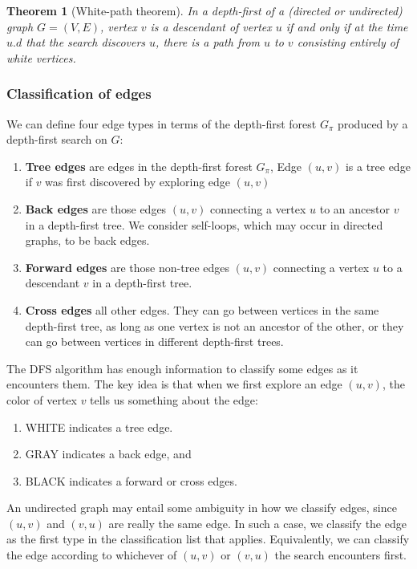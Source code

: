 \documentclass[12pt]{article}
\newtheorem{theorem}{Theorem}
\begin{document}
\begin{theorem} [White-path theorem]
  In a depth-first of a (directed or undirected) graph $G = (V,E)$, vertex $v$ is a descendant of vertex $u$ if and only if at the time $u.d$ that the search discovers $u$, there is a path from $u$ to $v$ consisting entirely of white vertices.
\end{theorem}

\subsubsection*{Classification of edges}

We can define four edge types in terms of the depth-first forest $G_{\pi}$ produced by a depth-first search on $G$:

\begin{enumerate}
  \item \textbf{Tree edges} are edges in the depth-first forest $G_{\pi}$, Edge $(u,v)$ is a tree edge if $v$ was first discovered by exploring edge $(u,v)$
  \item \textbf{Back edges} are those edges $(u,v)$ connecting a vertex $u$ to an ancestor $v$ in a depth-first tree. We consider self-loops, which may occur in directed graphs, to be back edges.
  \item \textbf{Forward edges} are those non-tree edges $(u,v)$ connecting a vertex $u$ to a descendant $v$ in a depth-first tree.
  \item \textbf{Cross edges} all other edges. They can go between vertices in the same depth-first tree, as long as one vertex is not an ancestor of the other, or they can go between vertices in different depth-first trees.
\end{enumerate}

The DFS algorithm has enough information to classify some edges as it encounters them. The key idea is that when we first explore an edge $(u,v)$, the color of vertex $v$ tells us something about the edge:

\begin{enumerate}
  \item WHITE indicates a tree edge.
  \item GRAY indicates a back edge, and
  \item BLACK indicates a forward or cross edges.
\end{enumerate}

An undirected graph may entail some ambiguity in how we classify edges, since $(u,v)$ and $(v,u)$ are really the same edge. In such a case, we classify the edge as the first type in the classification list that applies. Equivalently, we can classify the edge according to whichever of $(u,v)$ or $(v,u)$ the search encounters first.
\end{document}
